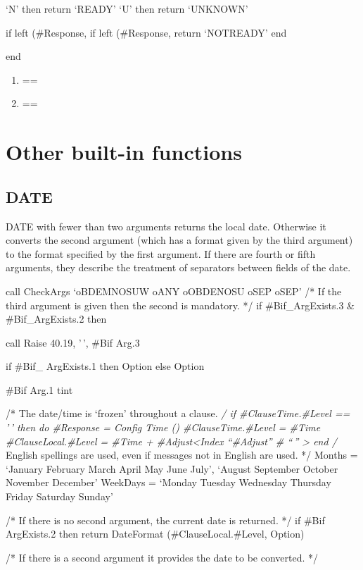 `N' then return `READY' `U' then return `UNKNOWN'

if left (\#Response, if left (\#Response, return `NOTREADY' end

end

\begin{enumerate}
\def\labelenumi{\arabic{enumi})}
\tightlist
\item
  ==
\item
  ==
\end{enumerate}

\section{Other built-in functions}\label{other-built-in-functions}

\subsection{DATE}\label{date}

DATE with fewer than two arguments returns the local date. Otherwise it
converts the second argument (which has a format given by the third
argument) to the format specified by the first argument. If there are
fourth or fifth arguments, they describe the treatment of separators
between fields of the date.

call CheckArgs `oBDEMNOSUW oANY oOBDENOSU oSEP oSEP' /* If the third
argument is given then the second is mandatory. */ if \#Bif\_ArgExists.3
\& \#Bif\_ArgExists.2 then

call Raise 40.19, '\,', \#Bif Arg.3

if \#Bif\_ ArgExists.1 then Option else Option

\#Bif Arg.1 tint

/* The date/time is `frozen' throughout a clause. \emph{/ if
\#ClauseTime.\#Level == '\,' then do \#Response = Config Time ()
\#ClauseTime.\#Level = \#Time \#ClauseLocal.\#Level = \#Time +
\#Adjust\textless Index ``\#Adjust'' \# ``\,'' \textgreater{} end /}
English spellings are used, even if messages not in English are used. */
Months = `January February March April May June July', `August September
October November December' WeekDays = `Monday Tuesday Wednesday Thursday
Friday Saturday Sunday'

/* If there is no second argument, the current date is returned. */ if
\#Bif ArgExists.2 then return DateFormat (\#ClauseLocal.\#Level, Option)

/* If there is a second argument it provides the date to be converted.
*/

